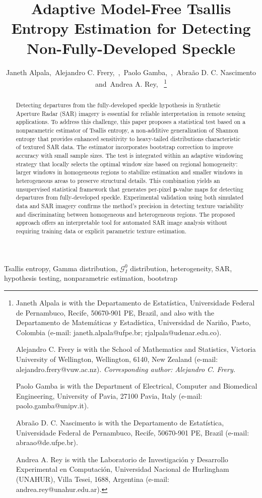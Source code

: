 \documentclass[
  lettersize  journal,
]{IEEEtran}%
\title{Adaptive Model-Free Tsallis Entropy Estimation for Detecting
Non-Fully-Developed Speckle}
\author{
Janeth Alpala\orcidlink{0000-0002-0265-6236},~Alejandro C.
Frery\orcidlink{0000-0002-8002-5341},~\IEEEmembership{Life Fellow,
IEEE},~Paolo
Gamba\orcidlink{0000-0002-9576-6337},~\IEEEmembership{Fellow,
IEEE},~Abraão D. C. Nascimento\orcidlink{0000-0003-2673-219X}
and~Andrea A.
Rey\orcidlink{0000-0002-9185-1382},~\IEEEmembership{Member, IEEE}%
\thanks{Janeth Alpala is with the Departamento de Estatística,
Universidade Federal de Pernambuco, Recife, 50670-901 PE, Brazil, and
also with the Departamento de Matemáticas y Estadística, Universidad de
Nariño, Pasto, Colombia (e-mail: janeth.alpala@ufpe.br;
rjalpala@udenar.edu.co).

Alejandro C. Frery is with the School of Mathematics and Statistics,
Victoria University of Wellington, Wellington, 6140, New Zealand
(e-mail: alejandro.frery@vuw.ac.nz).
\emph{Corresponding author: Alejandro C. Frery.}

Paolo Gamba is with the Department of Electrical, Computer and
Biomedical Engineering, University of Pavia, 27100 Pavia, Italy (e-mail:
paolo.gamba@unipv.it).

Abraão D. C. Nascimento is with the Departamento de Estatística,
Universidade Federal de Pernambuco, Recife, 50670-901 PE, Brazil
(e-mail: abraao@de.ufpe.br).

Andrea A. Rey is with the Laboratorio de Investigación y Desarrollo
Experimental en Computación, Universidad Nacional de Hurlingham
(UNAHUR), Villa Tesei, 1688, Argentina (e-mail:
andrea.rey@unahur.edu.ar).}
}
\begin{document}


\maketitle

\begin{abstract}
Detecting departures from the fully-developed speckle hypothesis in
Synthetic Aperture Radar (SAR) imagery is essential for reliable
interpretation in remote sensing applications. To address this
challenge, this paper proposes a statistical test based on a
nonparametric estimator of Tsallis entropy, a non-additive
generalization of Shannon entropy that provides enhanced sensitivity to
heavy-tailed distributions characteristic of textured SAR data. The
estimator incorporates bootstrap correction to improve accuracy with
small sample sizes. The test is integrated within an adaptive windowing
strategy that locally selects the optimal window size based on regional
homogeneity: larger windows in homogeneous regions to stabilize
estimation and smaller windows in heterogeneous areas to preserve
structural details. This combination yields an unsupervised statistical
framework that generates per-pixel \(\bm p\)-value maps for detecting
departures from fully-developed speckle. Experimental validation using
both simulated data and SAR imagery confirms the method's precision in
detecting texture variability and discriminating between homogeneous and
heterogeneous regions. The proposed approach offers an interpretable
tool for automated SAR image analysis without requiring training data or
explicit parametric texture estimation.
\end{abstract}
\begin{IEEEkeywords}
Tsallis entropy, Gamma distribution, \(\mathcal{G}_I^0\)
distribution, heterogeneity, SAR, hypothesis testing, nonparametric
estimation, bootstrap
\end{IEEEkeywords}

%
\end{document}
